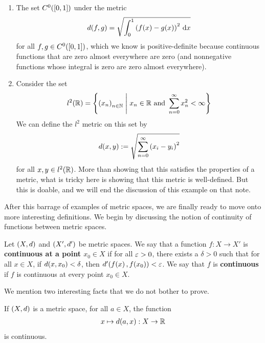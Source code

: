 \begin{boxexample}
\begin{enumerate}
        \item The set $C^0\!\left( \left[ 0, 1 \right] \right)$ under the metric
        \begin{align*}
            d(f, g) = \sqrt{\int_{0}^{1} \left( f(x) - g(x) \right)^2 \, \operatorname{d}\!x}
        \end{align*}
        for all $f, g \in C^0\!\left( \left[ 0, 1 \right] \right)$, which we know is positive-definite because continuous functions that are zero almost everywhere are zero (and nonnegative functions whose integral is zero are zero almost everywhere).

        \item Consider the set
        \begin{align*}
            l^2\!\left( \mathbb{R} \right) = \left\{ \left( x_n \right)_{n \in \mathbb{N}} \; \middle\vert \; x_n \in \mathbb{R} \text{ and } \sum_{n=0}^{\infty} x_n^2 < \infty \right\}
        \end{align*}
        We can define the $l^2$ metric on this set by
        \begin{align*}
            d(x, y) := \sqrt{\sum_{n=0}^{\infty} \left( x_i - y_i \right)^2}
        \end{align*}
        for all $x, y \in l^2\!\left( \mathbb{R} \right)$. More than showing that this satisfies the properties of a metric, what is tricky here is showing that this metric is well-defined. But this is doable, and we will end the discussion of this example on that note.
    \end{enumerate}
\end{boxexample}

After this barrage of examples of metric spaces, we are finally ready to move onto more interesting definitions. We begin by discussing the notion of continuity of functions between metric spaces.

\begin{boxdefinition}
    Let $\left( X, d \right)$ and $\left( X', d' \right)$ be metric spaces. We say that a function $f : X \to X'$ is \textbf{continuous at a point $x_0 \in X$} if for all $\varepsilon > 0$, there exists a $\delta > 0$ such that for all $x \in X$, if $d\!\left( x, x_0 \right) < \delta$, then $d'\!\left( f\!\left( x \right), f\!\left( x_0 \right) \right) < \varepsilon$. We say that $f$ is \textbf{continuous} if $f$ is continuous at every point $x_0 \in X$.
\end{boxdefinition}

We mention two interesting facts that we do not bother to prove.

\begin{boxexercise}
    If $\left( X, d \right)$ is a metric space, for all $a \in X$, the function
    \begin{align*}
        x \mapsto d\!\left( a, x \right) : X \to \mathbb{R}
    \end{align*}
    is continuous.
\end{boxexercise}


